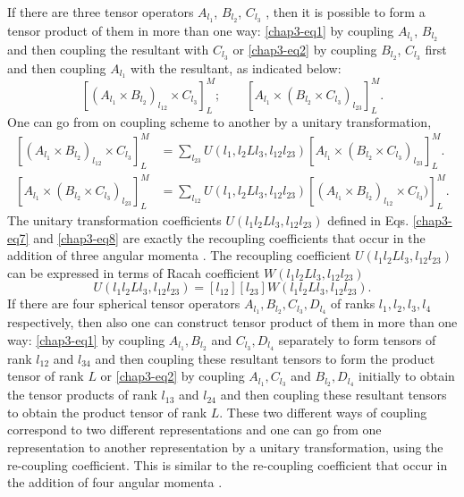 If there are three tensor operators $A_{l_1}$, $B_{l_2}$, $C_{l_3}$ , then it is possible to form a tensor product of them in more than one way: \eqref{chap3-eq1} by coupling $A_{l_1}$, $B_{l_2}$ and then coupling the resultant with $C_{l_3}$ or \eqref{chap3-eq2} by coupling $B_{l_2}$, $C_{l_3}$ first and then coupling $A_{l_1}$ with the resultant, as indicated below:
\begin{equation}
\left[ (A_{l_1} \times B_{l_2})_{l_{12}} \times C_{l_3}\right]^M_L;  \qquad \left[ A_{l_1} \times (B_{l_2} \times C_{l_3})_{l_{23}}\right]^M_L. \label{chap3-eq6}
\end{equation}
One can go from on coupling scheme to another by a unitary transformation,
\begin{align}
\left[ (A_{l_1} \times B_{l_2})_{l_{12}} \times C_{l_3}\right]^M_L  & = \sum_{l_{23}} U (l_1, l_2 L l_3, l_{12} l_{23}) 
\left[A_{l_1} \times (B_{l_2} \times C_{l_3})_{l_{23}} \right]^M_L. \label{chap3-eq7}\\ 
\left[ A_{l_1} \times (B_{l_2} \times C_{l_3})_{l_{23}}\right]^M_L & = \sum_{l_{12}} U (l_1, l_2 L l_3, l_{12} l_{23}) 
\left[(A_{l_1} \times B_{l_2})_{l_{12}} \times C_{l_3}) \right]^M_L. \label{chap3-eq8} 
\end{align}
The unitary transformation coefficients $U (l_1 l_2 L l_3, l_{12} l_{23})$ defined in Eqs. \eqref{chap3-eq7} and \eqref{chap3-eq8} are exactly the recoupling coefficients that occur in the addition of three angular momenta \cite{key11,key12}. The recoupling coefficient $U (l_1 l_2 Ll_3 , l_{12} l_{23})$ can be expressed in terms of Racah coefficient $W (l_1 l_2 Ll_3 , l_{12} l_{23})$ 
\begin{equation}
U (l_1 l_2 Ll_3 , l_{12} l_{23}) = [l_{12}][l_{23}] W (l_{1} l_2 Ll_3 , l_{12} l_{23}). \label{chap3-eq9}
\end{equation}
If there are four spherical tensor operators $A_{l_1}, B_{l_2}, C_{l_3}, D_{l_4}$ of ranks $l_1, l_2, l_3, l_4$ respectively, then also one can construct tensor product of them in more than one way: \eqref{chap3-eq1} by coupling $A_{l_1}, B_{l_2}$ and $C_{l_3}, D_{l_4}$ separately to form tensors of rank $l_{12}$ and $l_{34}$ and then coupling these resultant tensors to form the product tensor of rank $L$ or \eqref{chap3-eq2} by coupling $A_{l_1}, C_{l_3}$ and $B_{l_2}, D_{l_4}$ initially to obtain the tensor products of rank $l_{13}$ and $l_{24}$ and then coupling these resultant tensors to obtain the product tensor of rank $L$. These two different ways of coupling correspond to two different representations and one can go from one representation to another representation by a unitary transformation, using the re-coupling coefficient. This is similar to the re-coupling coefficient that occur in the addition of four angular momenta \cite{key11,key12}.

